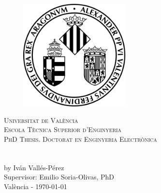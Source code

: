 \makeatletter
\begin{titlepage}

	\begin{figure}[t]
		\centering\includegraphics[width=0.5\textwidth]{titlepage/images/logo}
	\end{figure}
	
	\begin{center}
	\textsc{ \LARGE{Universitat de València \\}}
	\textsc{ \LARGE{Escola Tècnica Superior d'Enginyeria \\ }}
	\vspace{5mm}
	{\textsc{PhD Thesis. Doctorat en Enginyeria Electrònica}\\}
	\vspace{40mm}
	\LARGE{\textbf{\@title}}\\ \\
	{\large by Iván Vallés-Pérez \\}
	\vspace{40mm}
	\textnormal{Supervisor: Emilio Soria-Olivas, PhD \\ }
	\textnormal{València - \monthyeardate\today }
	\end{center}

\end{titlepage}
\makeatother